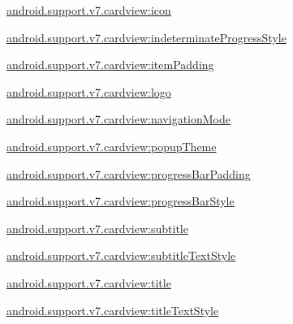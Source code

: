 {\ttfamily \hyperlink{classandroid_1_1support_1_1v7_1_1cardview_1_1R_1_1styleable_a788c4261e4e2b4b27f71511aa0b5ecba}{android.\+support.\+v7.\+cardview\+:icon}}

{\ttfamily \hyperlink{classandroid_1_1support_1_1v7_1_1cardview_1_1R_1_1styleable_af7f0316f1a19f747887a7f5be05475c1}{android.\+support.\+v7.\+cardview\+:indeterminate\+Progress\+Style}}

{\ttfamily \hyperlink{classandroid_1_1support_1_1v7_1_1cardview_1_1R_1_1styleable_a0300a227721a59ef431c82b92f5f7bf3}{android.\+support.\+v7.\+cardview\+:item\+Padding}}

{\ttfamily \hyperlink{classandroid_1_1support_1_1v7_1_1cardview_1_1R_1_1styleable_aa1f79988b3c132f89d1b38df0b419031}{android.\+support.\+v7.\+cardview\+:logo}}

{\ttfamily \hyperlink{classandroid_1_1support_1_1v7_1_1cardview_1_1R_1_1styleable_a323805477eb8f8741417f8383c1f14e2}{android.\+support.\+v7.\+cardview\+:navigation\+Mode}}

{\ttfamily \hyperlink{classandroid_1_1support_1_1v7_1_1cardview_1_1R_1_1styleable_ae6bbb52b8e6d4f856f7ffd1afa9696da}{android.\+support.\+v7.\+cardview\+:popup\+Theme}}

{\ttfamily \hyperlink{classandroid_1_1support_1_1v7_1_1cardview_1_1R_1_1styleable_a3ae19c2401365683869b64e9daa1c028}{android.\+support.\+v7.\+cardview\+:progress\+Bar\+Padding}}

{\ttfamily \hyperlink{classandroid_1_1support_1_1v7_1_1cardview_1_1R_1_1styleable_ad007b5dd0d482faea56e41cb49451b22}{android.\+support.\+v7.\+cardview\+:progress\+Bar\+Style}}

{\ttfamily \hyperlink{classandroid_1_1support_1_1v7_1_1cardview_1_1R_1_1styleable_a047276d496fb9634eb85f40b248c71bc}{android.\+support.\+v7.\+cardview\+:subtitle}}

{\ttfamily \hyperlink{classandroid_1_1support_1_1v7_1_1cardview_1_1R_1_1styleable_a6d8d0a0581b055a9ecd79f72356a2363}{android.\+support.\+v7.\+cardview\+:subtitle\+Text\+Style}}

{\ttfamily \hyperlink{classandroid_1_1support_1_1v7_1_1cardview_1_1R_1_1styleable_a9f462e0d5b1136610c581eb739fecd82}{android.\+support.\+v7.\+cardview\+:title}}

{\ttfamily \hyperlink{classandroid_1_1support_1_1v7_1_1cardview_1_1R_1_1styleable_a4032c4461fdd3a308959f8403e6dd628}{android.\+support.\+v7.\+cardview\+:title\+Text\+Style}}

